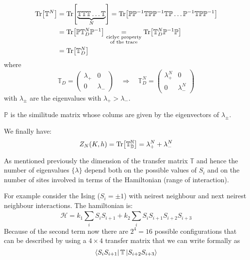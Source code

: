 \documentclass[../main/main.tex]{subfiles}
\begin{document}
\begin{equation}
\begin{split}
  \Tr[\mathbb{T}^N] &= \Tr[\underbrace{\mathbb{T} \mathbb{T} \mathbb{T} \dots \mathbb{T}}_{N} ] = \Tr[ \mathbb{P} \mathbb{P}^{-1} \mathbb{T} \mathbb{P} \mathbb{P}^{-1} \mathbb{T} \mathbb{P} \dots \mathbb{P}^{-1}  \mathbb{T} \mathbb{P} \mathbb{P}^{-1} ]    \\
  & = \Tr[ \mathbb{P} \mathbb{T}_D^N \mathbb{P}^{-1}] \underset{\substack{ \text{ciclyc property} \\  \text{of the trace} } }{=} \Tr[ \mathbb{T}_D^N \mathbb{P}^{-1} \mathbb{P} ]\\
  & = \Tr[ \mathbb{T}_D^N]
\end{split}
\end{equation}
where
\begin{equation}
\mathbb{T}_D =  \begin{pmatrix}
  \lambda _+   & 0 \\
  0   & \lambda _-
  \end{pmatrix}
  \quad \Rightarrow \quad
  \mathbb{T}_D^N =  \begin{pmatrix}
    \lambda _+^N   & 0 \\
    0   & \lambda _-^N
    \end{pmatrix}
\end{equation}
with \( \lambda _{\pm} \) are the eigenvalues with \( \lambda _+ > \lambda _- \).
\begin{remark}
\( \mathbb{P} \) is the similitude matrix whose colums are given by the eigenvectors of \(   \lambda _{\pm} \).
\end{remark}
We finally have:
\begin{equation}
  Z_N (K,h) = \Tr[\mathbb{T_D^N}] = \lambda _+^N  + \lambda _-^N
\end{equation}
\begin{remark}
As mentioned previously the dimension of the transfer matrix \( \mathbb{T} \) and hence the number of eigenvalues \( \{ \lambda  \}   \) depend both on the possible values of \( S_i \) and on the number of sites involved in terms of the Hamiltonian (range of interaction).
\end{remark}
\begin{example}
For example consider the Ising (\( S_i = \pm 1\)) with neirest neighbour and next neirest neighbour interactions. The hamiltonian is:
\begin{equation}
  \mathcal{H} = k_1 \sum_{i}^{} S_i S_{i+1} + k_2 \sum_{i}^{} S_i S_{i+1} S_{i+2} S_{i+3}
\end{equation}
Because of the second term now there are \( 2^4 = 16 \) possible configurations that can be described by using a \( 4 \times 4 \) transfer matrix that we can write formally as
\begin{equation*}
  \bra{S_i S_{i+1}} \mathbb{T} \ket{S_{i+2} S_{i+3}}
\end{equation*}
\end{example}
\end{document}
